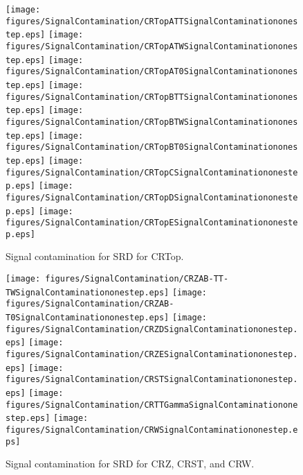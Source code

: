 \begin{figure}[htbp]
\begin{center} 
\texttt{[image: figures/SignalContamination/CRTopATTSignalContaminationonestep.eps]}
\texttt{[image: figures/SignalContamination/CRTopATWSignalContaminationonestep.eps]}
\texttt{[image: figures/SignalContamination/CRTopAT0SignalContaminationonestep.eps]}
\texttt{[image: figures/SignalContamination/CRTopBTTSignalContaminationonestep.eps]}
\texttt{[image: figures/SignalContamination/CRTopBTWSignalContaminationonestep.eps]}
\texttt{[image: figures/SignalContamination/CRTopBT0SignalContaminationonestep.eps]}
\texttt{[image: figures/SignalContamination/CRTopCSignalContaminationonestep.eps]}
\texttt{[image: figures/SignalContamination/CRTopDSignalContaminationonestep.eps]}
\texttt{[image: figures/SignalContamination/CRTopESignalContaminationonestep.eps]}
\caption{Signal contamination for SRD for CRTop.}
\label{fig:Fit2ele}
\end{center}
\end{figure}

\begin{figure}[htbp]
\begin{center} 
\texttt{[image: figures/SignalContamination/CRZAB-TT-TWSignalContaminationonestep.eps]}
\texttt{[image: figures/SignalContamination/CRZAB-T0SignalContaminationonestep.eps]}
\texttt{[image: figures/SignalContamination/CRZDSignalContaminationonestep.eps]}
\texttt{[image: figures/SignalContamination/CRZESignalContaminationonestep.eps]}
\texttt{[image: figures/SignalContamination/CRSTSignalContaminationonestep.eps]}
\texttt{[image: figures/SignalContamination/CRTTGammaSignalContaminationonestep.eps]}
\texttt{[image: figures/SignalContamination/CRWSignalContaminationonestep.eps]}
\caption{Signal contamination for SRD for CRZ, CRST, and CRW.}
\label{fig:Fit2ele}
\end{center}
\end{figure}


